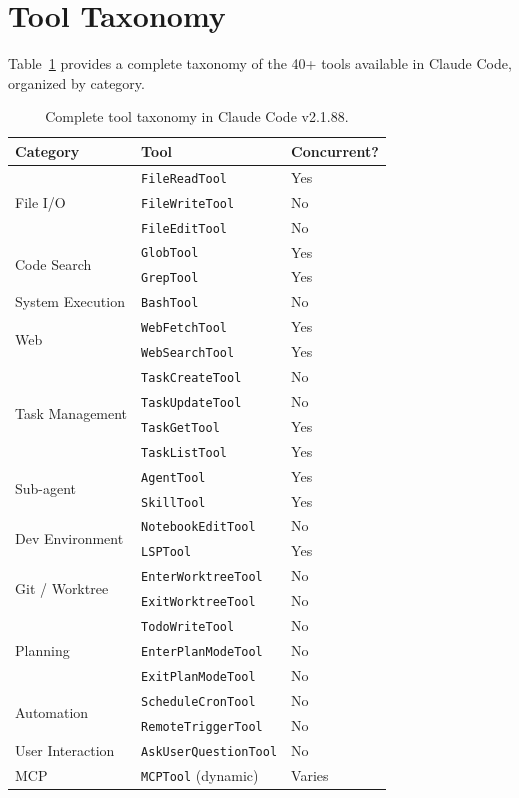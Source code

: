 \documentclass{article}
\begin{document}
\appendix
\section{Tool Taxonomy}
\label{app:tools}

Table~\ref{tab:tools} provides a complete taxonomy of the 40+ tools available in Claude Code, organized by category.

\begin{table}[h]
\centering
\caption{Complete tool taxonomy in Claude Code v2.1.88.}
\label{tab:tools}
\small
\begin{tabular}{lll}
\toprule
\textbf{Category} & \textbf{Tool} & \textbf{Concurrent?} \\
\midrule
\multirow{3}{*}{File I/O}
  & \texttt{FileReadTool} & Yes \\
  & \texttt{FileWriteTool} & No \\
  & \texttt{FileEditTool} & No \\
\midrule
\multirow{2}{*}{Code Search}
  & \texttt{GlobTool} & Yes \\
  & \texttt{GrepTool} & Yes \\
\midrule
System Execution
  & \texttt{BashTool} & No \\
\midrule
\multirow{2}{*}{Web}
  & \texttt{WebFetchTool} & Yes \\
  & \texttt{WebSearchTool} & Yes \\
\midrule
\multirow{4}{*}{Task Management}
  & \texttt{TaskCreateTool} & No \\
  & \texttt{TaskUpdateTool} & No \\
  & \texttt{TaskGetTool} & Yes \\
  & \texttt{TaskListTool} & Yes \\
\midrule
\multirow{2}{*}{Sub-agent}
  & \texttt{AgentTool} & Yes \\
  & \texttt{SkillTool} & Yes \\
\midrule
\multirow{2}{*}{Dev Environment}
  & \texttt{NotebookEditTool} & No \\
  & \texttt{LSPTool} & Yes \\
\midrule
\multirow{2}{*}{Git / Worktree}
  & \texttt{EnterWorktreeTool} & No \\
  & \texttt{ExitWorktreeTool} & No \\
\midrule
\multirow{3}{*}{Planning}
  & \texttt{TodoWriteTool} & No \\
  & \texttt{EnterPlanModeTool} & No \\
  & \texttt{ExitPlanModeTool} & No \\
\midrule
\multirow{2}{*}{Automation}
  & \texttt{ScheduleCronTool} & No \\
  & \texttt{RemoteTriggerTool} & No \\
\midrule
User Interaction
  & \texttt{AskUserQuestionTool} & No \\
\midrule
MCP
  & \texttt{MCPTool} (dynamic) & Varies \\
\bottomrule
\end{tabular}
\end{table}
\end{document}
